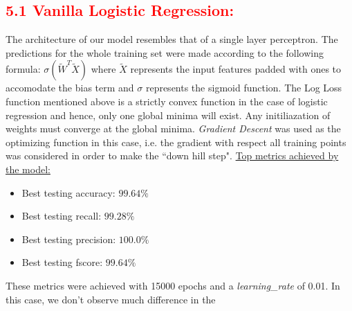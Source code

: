 \documentclass[a4paper,10pt,twocolumn]{article}
\begin{document}
\subsection*{\textcolor{red}{5.1 Vanilla Logistic Regression:}}
The architecture of our model resembles that of a single layer perceptron. The predictions for the whole training set were made according to the following formula: $\sigma(\widetilde{W}^T \widetilde{X})$ where $\widetilde{X}$ represents the input features padded with ones to accomodate the bias term and $\sigma$ represents the sigmoid function. The Log Loss function mentioned above is a strictly convex function in the case of logistic regression and hence, only one global minima will exist. Any initiliazation of weights must converge at the global minima. \textit{Gradient Descent} was used as the optimizing function in this case, i.e. the gradient with respect all training points was considered in order to make the ``down hill step".
\newline
\newline
\underline{Top metrics achieved by the model:}
\begin{itemize}
\item{Best testing accuracy: $99.64\%$}
\item{Best testing recall: $99.28\%$}
\item{Best testing precision: $100.0\%$}
\item{Best testing fscore: $99.64\%$}
\end{itemize}
These metrics were achieved with 15000 epochs and a \textit{learning\_rate} of 0.01. In this case, we don't observe much difference in the 
\end{document}
